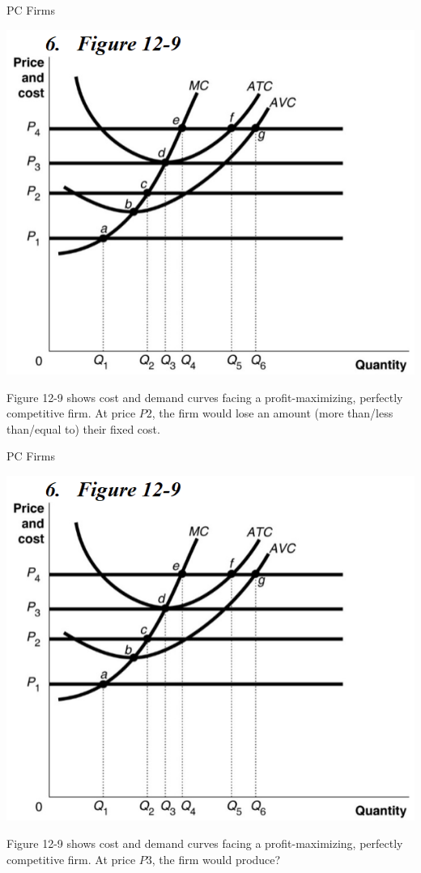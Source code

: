 \documentclass{beamer}
\begin{document}
\begin{frame}[t]{PC Firms}
    \begin{center}
        \includegraphics[scale=.6]{images/graph.png}
    \end{center}
    \newline
    Figure 12-9 shows cost and demand curves facing a profit-maximizing, perfectly competitive firm. At price $P2$, the firm would lose an amount (more than/less than/equal to) their fixed cost.
\end{frame}

\begin{frame}[t]{PC Firms}
    \begin{center}
        \includegraphics[scale=.6]{images/graph.png}
    \end{center}
    \newline
    Figure 12-9 shows cost and demand curves facing a profit-maximizing, perfectly competitive firm. At price $P3$, the firm would produce?
\end{frame}
\end{document}
